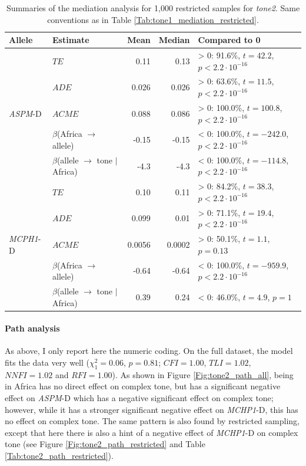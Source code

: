 \documentclass[twoside,onecolumn]{article}
\begin{document}
\begin{table}[h]
  \caption{Summaries of the mediation analysis for 1,000 restricted samples for \textit{tone2}. Same conventions as in Table \ref{Tab:tone1_mediation_restricted}.}
  \label{Tab:tone2_mediation_restricted}
  \centering
  \begin{tabular}{|l|l|r|r|l|}
    \toprule
    \textbf{Allele} & \textbf{Estimate} & \textbf{Mean} & \textbf{Median} & \textbf{Compared to 0} \\
    \midrule
    \multirow{5}{*}{\textit{ASPM}-D} & $TE$ & 0.11 & 0.13 & > 0: 91.6\%, $t = 42.2$, $p < 2.2\cdot10^{-16}$ \\
    & $ADE$ & 0.026 & 0.026 & > 0: 63.6\%, $t = 11.5$, $p < 2.2\cdot10^{-16}$ \\
    & $ACME$ & 0.088 & 0.086 & > 0: 100.0\%, $t = 100.8$, $p < 2.2\cdot10^{-16}$ \\
    & $\beta$(Africa $\rightarrow$ allele) & -0.15 &  -0.15 & < 0: 100.0\%, $t = -242.0$, $p < 2.2\cdot10^{-16}$ \\
    & $\beta$(allele $\rightarrow$ tone $\mid$ Africa) & -4.3 & -4.3 & < 0: 100.0\%, $t = -114.8$, $p < 2.2\cdot10^{-16}$ \\
    \midrule
    \multirow{5}{*}{\textit{MCPH1}-D} & $TE$ & 0.10 & 0.11 & > 0: 84.2\%, $t = 38.3$, $p < 2.2\cdot10^{-16}$ \\
    & $ADE$ & 0.099 & 0.01 & > 0: 71.1\%, $t = 19.4$, $p < 2.2\cdot10^{-16}$ \\
    & $ACME$ & 0.0056 & 0.0002 & > 0: 50.1\%, $t = 1.1$, $p = 0.13$ \\
    & $\beta$(Africa $\rightarrow$ allele) & -0.64 & -0.64 & < 0: 100.0\%, $t = -959.9$, $p < 2.2\cdot10^{-16}$ \\
    & $\beta$(allele $\rightarrow$ tone $\mid$ Africa) & 0.39 & 0.24 & < 0: 46.0\%, $t = 4.9$, $p = 1$ \\
    \bottomrule
  \end{tabular}
\end{table}


\paragraph{Path analysis}

As above, I only report here the numeric coding.
On the full dataset, the model fits the data very well ($\chi^2_{1} = 0.06$, $p = 0.81$; $CFI=1.00$, $TLI=1.02$, $NNFI=1.02$ and $RFI=1.00$).
As shown in Figure \ref{Fig:tone2_path_all}, being in Africa has no direct effect on complex tone, but has a significant negative effect on \textit{ASPM}-D which has a negative significant effect on complex tone; however, while it has a stronger significant negative effect on \textit{MCHP1}-D, this has no effect on complex tone.
The same pattern is also found by restricted sampling, except that here there is also a hint of a negative effect of \textit{MCHP1}-D on complex tone (see Figure \ref{Fig:tone2_path_restricted} and Table \ref{Tab:tone2_path_restricted}).
\end{document}
